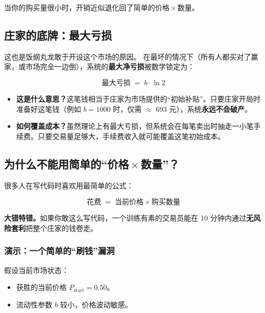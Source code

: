 \documentclass[11pt,a4paper,twoside]{article}
\begin{document}
当你的购买量很小时，开销近似退化回了简单的\;价格\,$\times$\,数量。

\subsection{庄家的底牌：最大亏损}

这也是饭纲丸龙敢于开设这个市场的原因。
在最坏的情况下（所有人都买对了赢家，或市场完全一边倒），系统的\textbf{最大净亏损}被数学锁定为：

\begin{mathbox}
\[
  \text{最大亏损} \;=\; b \cdot \ln 2
\]
\end{mathbox}

\begin{itemize}
  \item \textbf{这是什么意思？}\;这笔钱相当于庄家为市场提供的“初始补贴”。只要庄家开局时准备好这笔钱（例如 $b=1000$ 时，仅需 $\approx$ 693 元），系统\textbf{永远不会破产}。
  \item \textbf{如何覆盖成本？}\;虽然理论上有最大亏损，但系统会在每笔卖出时抽走一小笔手续费。只要交易量足够大，手续费收入就可能覆盖这笔初始成本。
\end{itemize}

\subsection{\texorpdfstring{为什么不能用简单的“价格\,$\times$\,数量”？}{为什么不能用简单的"价格 × 数量"？}}

很多人在写代码时喜欢用最简单的公式：

\[
  \text{花费} \;=\; \text{当前价格} \times \text{购买数量}
\]

\begin{warnbox}
\textbf{大错特错。}\;如果你敢这么写代码，一个训练有素的交易员能在 10 分钟内通过\textbf{无风险套利}把整个庄家的钱卷走。
\end{warnbox}

\subsubsection*{演示：一个简单的“刷钱”漏洞}

假设当前市场状态：

\begin{itemize}
  \item \Reimu 获胜的当前价格 $P_{\text{start}} = 0.50$。
  \item 流动性参数 $b$ 较小，价格波动敏感。
\end{itemize}
\end{document}
